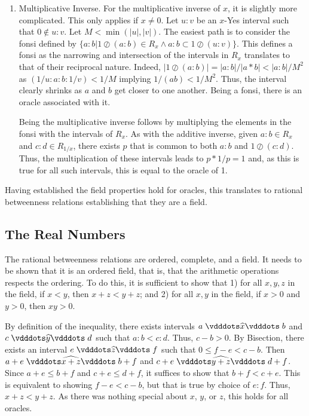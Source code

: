 \documentclass[12pt]{article}
\begin{document}
\begin{enumerate}
    \item Multiplicative Inverse. For the multiplicative inverse of $x$, it is slightly more complicated. This only applies if $x \neq 0$. Let $u:v$ be an $x$-Yes interval such that $0 \notin u:v$. Let $M < \min(|u|, |v|)$. 
    The easiest path is to consider the fonsi defined by $\{ a:b | 1 \oslash (a:b) \in R_x \wedge a:b \subset 1 \oslash (u:v) \}$. This defines a fonsi as the narrowing and intersection of the intervals in $R_x$ translates to that of their reciprocal nature. Indeed, $|1 \oslash (a:b)| = |a:b|/|a*b| < |a:b|/M^2$ as $(1/u : a : b: 1/v) < 1/M$ implying $1/(ab)< 1/M^2$. Thus, the interval clearly shrinks as $a$ and $b$ get closer to one another. Being a fonsi, there is an oracle associated with it. 

    Being the multiplicative inverse follows by multiplying the elements in the fonsi with the intervals of $R_x$. As with the additive inverse, given $a:b \in R_x$ and $c:d \in R_{1/x}$, there exists $p$ that is common to both $a:b$ and $1 \oslash (c:d)$. Thus, the multiplication of these intervals leads to $p *1/p = 1$ and, as this is true for all such intervals, this is equal to the oracle of 1. 

\end{enumerate}

Having established the field properties hold for oracles, this translates to rational betweenness relations establishing that they are a field. 


\subsection{The Real Numbers}

The rational betweenness relations are ordered, complete, and a field. It needs to be shown that it is an ordered field, that is, that the arithmetic operations respects the ordering. To do this, it is sufficient to show that 1) for all $x, y, z$ in the field, if $x<y$, then $x + z < y +z$; and 2) for all $x, y$ in the field, if $x >0$ and $y>0$, then $xy > 0 $.

By definition of the inequality, there exists intervals $ a \xora[x] b$ and $c \xora[y] d$ such that $a:b < c:d$. Thus, $c-b > 0$. By Bisection, there exists an interval $e \xora[z] f$ such that $0 \leq f-e < c-b$. Then $a+e \xora[x+z] b+f$ and $c+e \xora[y+z] d+f$. Since $a+e \leq  b+f$ and $c+e \leq d+f$, it suffices to show that $b+f < c+e$. This is equivalent to showing $f-e < c-b$, but that is true by choice of $e:f$. Thus, $x+z < y+z$. As there was nothing special about $x$, $y$, or $z$, this holds for all oracles. 
\end{document}
